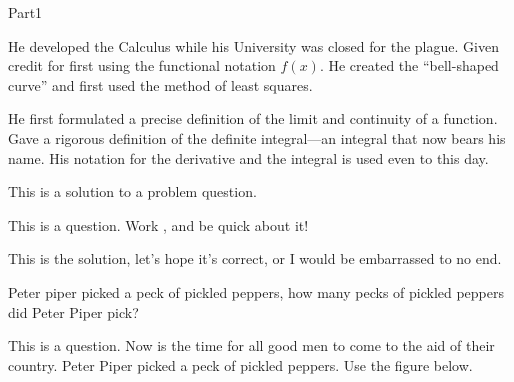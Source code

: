 \documentclass[10pt]{article}
\begin{document}
\begin{exam}[Part I.]{Part1}
\begin{problem}[5]
\begin{multicols}{2}
\begin{answers}{1}
 He developed the Calculus while his University was closed
for the plague.  %
 Given credit for first using the functional notation
$f(x)$. %
 He created the ``bell-shaped curve'' and first used the
method of least squares.  %

 He first formulated a precise definition of the limit
and continuity of a function.  %
 Gave a rigorous definition of the definite integral---an
integral that now bears his name.  %
 His notation for the derivative and the integral is used
even to this day. %

\end{answers}
\end{multicols}


\begin{solution}
This is a solution to a problem question.
\end{solution}

\end{problem}

\begin{problem}[3]
This is a question.  Work \OnBackOfPage, and be quick about it!

\begin{solution}[1in]
This is the solution, let's hope it's correct, or I would be embarrassed to no end.
\end{solution}
%
%
\begin{workarea}[.5\linewidth]{1in}
Peter piper picked a peck of pickled peppers, how many pecks of pickled
peppers did Peter Piper pick?
%
\vfill\hfill\setlength{\fboxsep}{6pt}
\end{workarea}
\end{problem}

\begin{problem}[7]
This is a question. Now is the time for all good men to come to
the aid of their country. Peter Piper picked a peck of pickled
peppers. Use the figure below.



\end{problem}
\end{exam}
\end{document}
